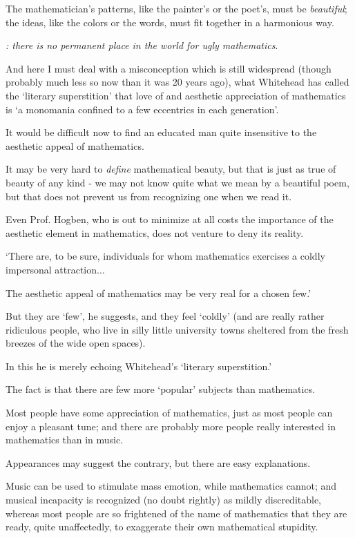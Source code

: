 \documentclass{article}
\numberwithin{equation}{section}
\begin{document}
%
The mathematician's patterns, like the painter's or the poet's, must be \textit{beautiful}; the ideas, like the colors or the words, must fit together in a harmonious way.

\textit{: there is no permanent place in the world for ugly mathematics}.

And here I must deal with a misconception which is still widespread (though probably much less so now than it was 20 years ago), what Whitehead has called the `literary superstition' that love of and aesthetic appreciation of mathematics is `a monomania confined to a few eccentrics in each generation'.

%
It would be difficult now to find an educated man quite insensitive to the aesthetic appeal of mathematics.

It may be very hard to \textit{define} mathematical beauty, but that is just as true of beauty of any kind - we may not know quite what we mean by a beautiful poem, but that does not prevent us from recognizing one when we read it.

Even Prof. Hogben, who is out to minimize at all costs the importance of the aesthetic element in mathematics, does not venture to deny its reality.

`There are, to be sure, individuals for whom mathematics exercises a coldly impersonal attraction$\ldots$

The aesthetic appeal of mathematics may be very real for a chosen few.'

But they are `few', he suggests, and they feel `coldly' (and are really rather ridiculous people, who live in silly little university towns sheltered from the fresh breezes of the wide open spaces).

In this he is merely echoing Whitehead's `literary superstition.'

%
The fact is that there are few more `popular' subjects than mathematics.

Most people have some appreciation of mathematics, just as most people can enjoy a pleasant tune; and there are probably more people really interested in mathematics than in music.

Appearances may suggest the contrary, but there are easy explanations.

Music can be used to stimulate mass emotion, while mathematics cannot; and musical incapacity is recognized (no doubt rightly) as mildly discreditable, whereas most people are so frightened of the name of mathematics that they are ready, quite unaffectedly, to exaggerate their own mathematical stupidity.
\end{document}
